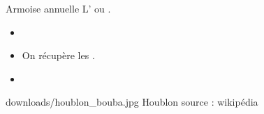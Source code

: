 
\ficheidentiteplante
{Armoise annuelle}
{%
    L' ou  .
}
{%
    \begin{itemize}[label = \bcplume]
        \item
    \end{itemize}
}
{%
    \begin{itemize}[label = \bcplume]
        \item On récupère les .
        \item 
    \end{itemize}
}
{%
    \begin{itemize}[label = \bccrayon]
        
    \end{itemize}
}
{%
    
}
{%
    downloads/houblon_bouba.jpg
}
{%
    Houblon
}
{%
    source : wikipédia
}

